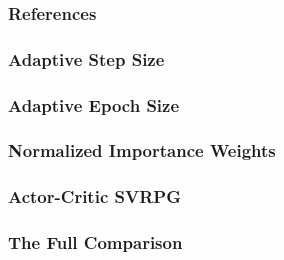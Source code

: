 \documentclass[aspectratio=169]{beamer}
\begin{document}
\begin{frame}
\frametitle{References}

\end{frame}

\begin{frame} 
\frametitle{Adaptive Step Size} 


\end{frame}

\begin{frame} 
\frametitle{Adaptive Epoch Size} 


\end{frame}

\begin{frame} 
\frametitle{Normalized Importance Weights} 


\end{frame}

\begin{frame} 
\frametitle{Actor-Critic SVRPG} 


\end{frame}

\begin{frame} 
\frametitle{The Full Comparison} 


\end{frame}
\end{document}

